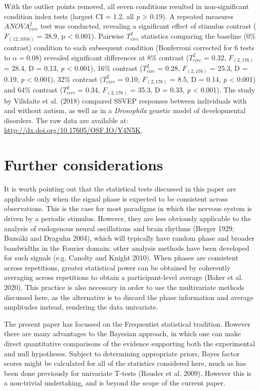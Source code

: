 \documentclass[]{article}
\begin{document}
With the outlier points removed, all seven conditions resulted in non-significant condition index tests (largest CI = 1.2, all \emph{p} \textgreater{} 0.19). A repeated measures \(ANOVA^2_{circ}\) test was conducted, revealing a significant effect of stimulus contrast (\(F_{(12,1056)}\) = 38.9, p \textless{} 0.001). Pairwise \(T^2_{circ}\) statistics comparing the baseline (0\% contrast) condition to each subsequent condition (Bonferroni corrected for 6 tests to \(\alpha = 0.08\)) revealed significant differences at 8\% contrast (\(T^2_{circ}\) = 0.32, \(F_{(2,176)}\) = 28.4, D = 0.13, \emph{p} \textless{} 0.001), 16\% contrast (\(T^2_{circ}\) = 0.28, \(F_{(2,176)}\) = 25.3, D = 0.19, \emph{p} \textless{} 0.001), 32\% contrast (\(T^2_{circ}\) = 0.10, \(F_{(2,176)}\) = 8.5, D = 0.14, \emph{p} \textless{} 0.001) and 64\% contrast (\(T^2_{circ}\) = 0.34, \(F_{(2,176)}\) = 35.3, D = 0.33, \emph{p} \textless{} 0.001). The study by Vilidaite et al. (2018) compared SSVEP responses between individuals with and without autism, as well as in a \emph{Drosophila} genetic model of developmental disorders. The raw data are available at: \url{http://dx.doi.org/10.17605/OSF.IO/Y4N5K}.

\hypertarget{further-considerations}{%
\section{Further considerations}\label{further-considerations}}

It is worth pointing out that the statistical tests discussed in this paper are applicable only when the signal phase is expected to be consistent across observations. This is the case for most paradigms in which the nervous system is driven by a periodic stimulus. However, they are less obviously applicable to the analysis of endogenous neural oscillations and brain rhythms (Berger 1929; Buzsáki and Draguhn 2004), which will typically have random phase and broader bandwidths in the Fourier domain: other analysis methods have been developed for such signals (e.g. Canolty and Knight 2010). When phases are consistent across repetitions, greater statistical power can be obtained by coherently averaging across repetitions to obtain a participant-level average (Baker et al. 2020). This practice is also necessary in order to use the multivariate methods discussed here, as the alternative is to discard the phase information and average amplitudes instead, rendering the data univariate.

The present paper has focussed on the Frequentist statistical tradition. However there are many advantages to the Bayesian approach, in which one can make direct quantitative comparisons of the evidence supporting both the experimental and null hypotheses. Subject to determining appropriate priors, Bayes factor scores might be calculated for all of the statistics considered here, much as has been done previously for univariate T-tests (Rouder et al. 2009). However this is a non-trivial undertaking, and is beyond the scope of the current paper.
\end{document}
